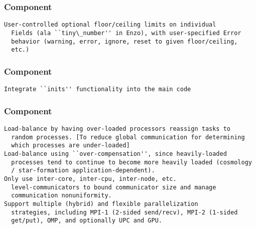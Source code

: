 \documentclass[14pt,letter]{article}
\begin{document}
\subsubsection{ Component}  \label{sss:fields-component}

\begin{verbatim}
User-controlled optional floor/ceiling limits on individual
  Fields (ala ``tiny\_number'' in Enzo), with user-specified Error
  behavior (warning, error, ignore, reset to given floor/ceiling,
  etc.)
\end{verbatim}

\subsubsection{ Component}  \label{sss:methods-component}

\begin{verbatim}
Integrate ``inits'' functionality into the main code
\end{verbatim}

\subsubsection{ Component}  \label{sss:parallel-component}

\begin{verbatim}
Load-balance by having over-loaded processors reassign tasks to
  random processes. [To reduce global communication for determining
  which processes are under-loaded]
Load-balance using ``over-compensation'', since heavily-loaded
  processes tend to continue to become more heavily loaded (cosmology
  / star-formation application-dependent).
Only use inter-core, inter-cpu, inter-node, etc.
  level-communicators to bound communicator size and manage
  communication nonuniformity.
Support multiple (hybrid) and flexible parallelization
  strategies, including MPI-1 (2-sided send/recv), MPI-2 (1-sided
  get/put), OMP, and optionally UPC and GPU.
\end{verbatim}

\end{document}
